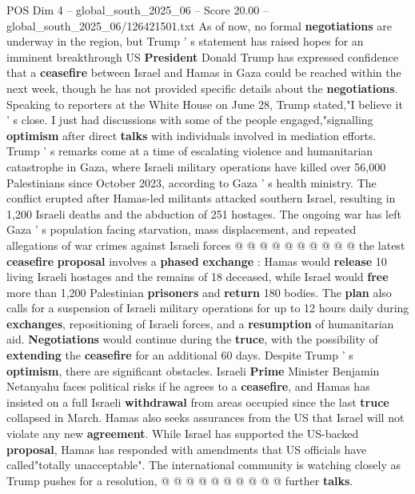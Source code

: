 \begin{textsample}{POS Dim 4 – global\_south\_2025\_06 – Score 20.00 – global\_south\_2025\_06/126421501.txt}  \label{ex:f4_pos_353}
As of now, no formal \textbf{negotiations} are underway in the region, but Trump ' s statement has raised hopes for an imminent breakthrough US \textbf{President} Donald Trump has expressed confidence that a \textbf{ceasefire} between Israel and Hamas in Gaza could be reached within the next week, though he has not provided specific details about the \textbf{negotiations}.
Speaking to reporters at the White House on June 28, Trump stated,"I believe it ' s close.
I just had discussions with some of the people engaged,"signalling \textbf{optimism} after direct \textbf{talks} with individuals involved in mediation efforts.
Trump ' s remarks come at a time of escalating violence and humanitarian catastrophe in Gaza, where Israeli military operations have killed over 56,000 Palestinians since October 2023, according to Gaza ' s health ministry.
The conflict erupted after Hamas-led militants attacked southern Israel, resulting in 1,200 Israeli deaths and the abduction of 251 hostages.
The ongoing war has left Gaza ' s population facing starvation, mass displacement, and repeated allegations of war crimes against Israeli forces @ @ @ @ @ @ @ @ @ @ the latest \textbf{ceasefire} \textbf{proposal} involves a \textbf{phased} \textbf{exchange} : Hamas would \textbf{release} 10 living Israeli hostages and the remains of 18 deceased, while Israel would \textbf{free} more than 1,200 Palestinian \textbf{prisoners} and \textbf{return} 180 bodies.
The \textbf{plan} also calls for a suspension of Israeli military operations for up to 12 hours daily during \textbf{exchanges}, repositioning of Israeli forces, and a \textbf{resumption} of humanitarian aid. \textbf{Negotiations} would continue during the \textbf{truce}, with the possibility of \textbf{extending} the \textbf{ceasefire} for an additional 60 days.
Despite Trump ' s \textbf{optimism}, there are significant obstacles.
Israeli \textbf{Prime} Minister Benjamin Netanyahu faces political risks if he agrees to a \textbf{ceasefire}, and Hamas has insisted on a full Israeli \textbf{withdrawal} from areas occupied since the last \textbf{truce} collapsed in March.
Hamas also seeks assurances from the US that Israel will not violate any new \textbf{agreement}.
While Israel has supported the US-backed \textbf{proposal}, Hamas has responded with amendments that US officials have called"totally unacceptable".
The international community is watching closely as Trump pushes for a resolution, @ @ @ @ @ @ @ @ @ @ further \textbf{talks}.

\end{textsample}
